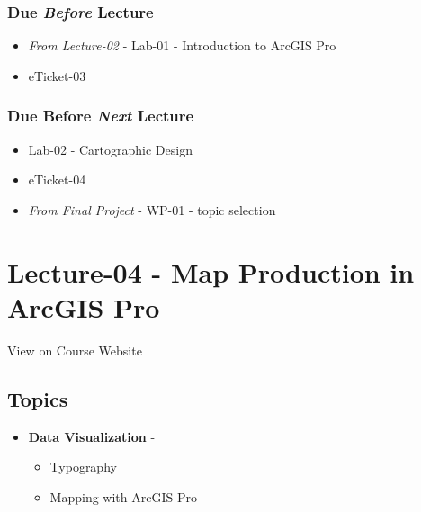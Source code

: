 \documentclass[]{book}
\providecommand{\tightlist}{%
  \setlength{\itemsep}{0pt}\setlength{\parskip}{0pt}}
\begin{document}
\hypertarget{due-before-lecture-2}{%
\subsubsection*{\texorpdfstring{Due \emph{Before} Lecture}{Due Before Lecture}}\label{due-before-lecture-2}}

\begin{itemize}
\tightlist
\item
  \emph{From Lecture-02} - Lab-01 - Introduction to ArcGIS Pro
\item
  eTicket-03
\end{itemize}

\hypertarget{due-before-next-lecture-1}{%
\subsubsection*{\texorpdfstring{Due Before \emph{Next} Lecture}{Due Before Next Lecture}}\label{due-before-next-lecture-1}}

\begin{itemize}
\tightlist
\item
  Lab-02 - Cartographic Design
\item
  eTicket-04
\item
  \emph{From Final Project} - WP-01 - topic selection
\end{itemize}

\hypertarget{lecture-04---map-production-in-arcgis-pro}{%
\section*{Lecture-04 - Map Production in ArcGIS Pro}\label{lecture-04---map-production-in-arcgis-pro}}

View on Course Website

\hypertarget{topics-4}{%
\subsection*{Topics}\label{topics-4}}

\begin{itemize}
\tightlist
\item
  \textbf{Data Visualization} -

  \begin{itemize}
  \tightlist
  \item
    Typography
  \item
    Mapping with ArcGIS Pro
  \end{itemize}
\end{itemize}
\end{document}

